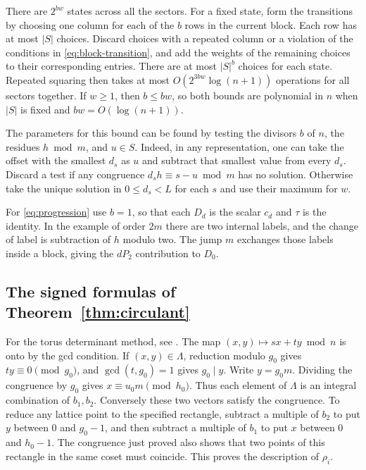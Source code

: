 \documentclass[11pt,reqno]{amsart}
\theoremstyle{remark}
\numberwithin{equation}{section}
\begin{document}
There are \(2^{bw}\) states across all the sectors. For a fixed
state, form the transitions by choosing one column for each of
the \(b\) rows in the current block. Each row has at most \(|S|\)
choices. Discard choices with a repeated column or a violation
of the conditions in \eqref{eq:block-transition}, and add the
weights of the remaining choices to their corresponding entries.
There are at most \(|S|^b\) choices for each state. Repeated
squaring then takes at most \(O(2^{3bw}\log(n+1))\) operations
for all sectors together. If \(w\ge1\), then \(b\le bw\), so
both bounds are polynomial in \(n\) when \(|S|\) is fixed and
\(bw=O(\log(n+1))\).

The parameters for this bound can be found by testing the
divisors \(b\) of \(n\), the residues \(h\bmod m\), and
\(u\in S\). Indeed, in any representation, one can take the
offset with the smallest \(d_s\) as \(u\) and subtract that
smallest value from every \(d_s\). Discard a test if any congruence
\(d_sh\equiv s-u\bmod m\) has no solution. Otherwise take the
unique solution in \(0\le d_s<L\) for each \(s\) and use their
maximum for \(w\).

For \eqref{eq:progression} use \(b=1\), so that each \(D_d\) is the
scalar \(c_d\) and \(\tau\) is the identity. In the example of order
\(2m\) there are two internal labels, and the change of label is
subtraction of \(h\) modulo two. The jump \(m\) exchanges those labels
inside a block, giving the \(dP_2\) contribution to \(D_0\).

\subsection{The signed formulas of Theorem~\ref{thm:circulant}}

For the torus determinant method, see \cite{CodenottiRestaSparse,Kenyon}.
The map \((x,y)\mapsto sx+ty\bmod n\) is onto by the gcd condition. If
\((x,y)\in\Lambda\), reduction modulo \(g_0\) gives
\(ty\equiv0\pmod{g_0}\), and \(\gcd(t,g_0)=1\) gives \(g_0\mid y\). Write
\(y=g_0m\). Dividing the congruence by \(g_0\) gives \(x\equiv
u_0m\pmod{h_0}\). Thus each element of \(\Lambda\) is an integral
combination of \(b_1,b_2\). Conversely these two vectors satisfy the
congruence. To reduce any lattice point to the specified rectangle,
subtract a multiple of \(b_2\) to put \(y\) between \(0\) and \(g_0-1\),
and then subtract a multiple of \(b_1\) to put \(x\) between \(0\) and
\(h_0-1\). The congruence just proved also shows that two points of this
rectangle in the same coset must coincide. This proves the description of
\(\rho_i\).
\end{document}
